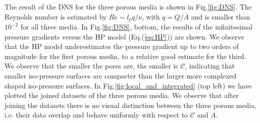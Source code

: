 \documentclass[draft]{agujournal2019}
\begin{document}

The result of the DNS for the three porous media is shown in Fig.\ref{fig:DNS}. The Reynolds number is estimated by $Re \sim l_p q/\nu$, with $q = Q/\overline{A}$ and is smaller than $10^{-2}$ for all three media. In Fig.\ref{fig:DNS}, bottom, the results of the infinitesimal pressure gradients versus the HP model (Eq.(\ref{eq:HP})) are shown. We observe that the HP model underestimates the pressure gradient up to two orders of magnitude for the first porous media, to a relative good estimate for the third. We observe that the smaller the pores are, the smaller is $\mathcal{C}$, indicating that smaller iso-pressure surfaces are compacter than the larger more complexed shaped iso-pressure surfaces. In Fig.\ref{fig:local_and_integrated} (top left) we have plotted the joined datasets of the three porous media. We observe that after joining the datasets there is no visual distinction between the three porous media, i.e. their data overlap and behave uniformly with respect to $\mathcal{C}$ and $A$.
 
\end{document}
